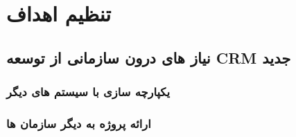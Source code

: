 \section{تنظیم اهداف}


\subsection{نیاز های درون سازمانی از توسعه CRM جدید}
\subsubsection{یکپارچه سازی با سیستم های دیگر}
\subsubsection{ارائه پروژه به دیگر سازمان ها}
